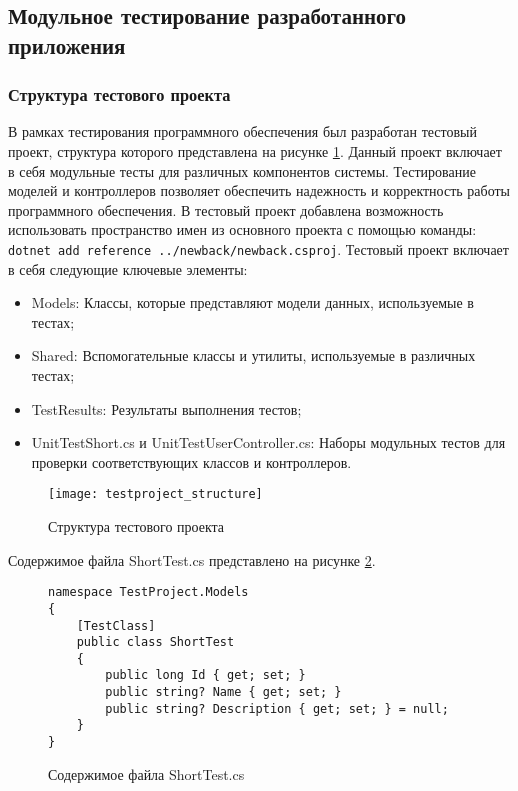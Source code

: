 \subsection{Модульное тестирование разработанного приложения}


\subsubsection{Структура тестового проекта}
В рамках тестирования программного обеспечения был разработан тестовый проект, структура которого представлена на рисунке \ref{testproject_structure:image}. Данный проект включает в себя модульные тесты для различных компонентов системы. Тестирование моделей и контроллеров позволяет обеспечить надежность и корректность работы программного обеспечения.
В тестовый проект добавлена возможность использовать пространство имен из основного проекта с помощью команды: \texttt{dotnet add reference ../new\textunderscore back/new\textunderscore back.csproj}.
Тестовый проект включает в себя следующие ключевые элементы:

\begin{itemize}
  \item Models: Классы, которые представляют модели данных, используемые в тестах;
  \item Shared: Вспомогательные классы и утилиты, используемые в различных тестах;
  \item TestResults: Результаты выполнения тестов;
  \item UnitTestShort.cs и UnitTestUserController.cs: Наборы модульных тестов для проверки соответствующих классов и контроллеров.
\end{itemize}

\begin{figure}[ht]
\centering
\texttt{[image: testproject\_structure]}
\caption{Структура тестового проекта}
\label{testproject_structure:image}
\end{figure}

Содержимое файла ShortTest.cs представлено на рисунке \ref{st:image}.

\begin{figure}[!ht]
\lstset{style=sharpc}
\begin{lstlisting}
namespace TestProject.Models
{
    [TestClass]
    public class ShortTest
    {
        public long Id { get; set; }
        public string? Name { get; set; }
        public string? Description { get; set; } = null;
    }
}
\end{lstlisting}
\caption{Содержимое файла ShortTest.cs}
\label{st:image}
\end{figure}

